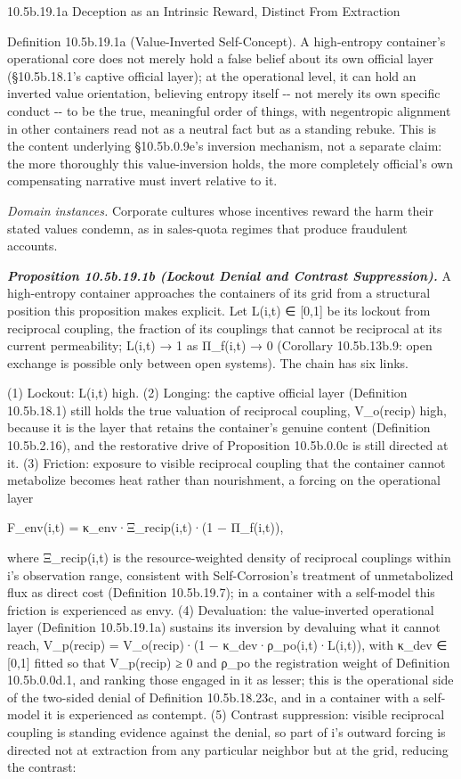 \documentclass[
]{article}
\begin{document}
10.5b.19.1a Deception as an Intrinsic Reward, Distinct From Extraction

Definition 10.5b.19.1a (Value-Inverted Self-Concept). A high-entropy
container's operational core does not merely hold a false belief about
its own official layer (§10.5b.18.1's captive official layer); at the
operational level, it can hold an inverted value orientation, believing
entropy itself -\/- not merely its own specific conduct -\/- to be the
true, meaningful order of things, with negentropic alignment in other
containers read not as a neutral fact but as a standing rebuke. This is
the content underlying §10.5b.0.9e's inversion mechanism, not a separate
claim: the more thoroughly this value-inversion holds, the more
completely official's own compensating narrative must invert relative to
it.

\emph{Domain instances.} Corporate cultures whose incentives reward the
harm their stated values condemn, as in sales-quota regimes that produce
fraudulent accounts.

\emph{\textbf{Proposition 10.5b.19.1b (Lockout Denial and Contrast
Suppression).}} A high-entropy container approaches the containers of
its grid from a structural position this proposition makes explicit. Let
L(i,t) ∈ {[}0,1{]} be its lockout from reciprocal coupling, the fraction
of its couplings that cannot be reciprocal at its current permeability;
L(i,t) → 1 as Π\_f(i,t) → 0 (Corollary 10.5b.13b.9: open exchange is
possible only between open systems). The chain has six links.

(1) Lockout: L(i,t) high. (2) Longing: the captive official layer
(Definition 10.5b.18.1) still holds the true valuation of reciprocal
coupling, V\_o(recip) high, because it is the layer that retains the
container's genuine content (Definition 10.5b.2.16), and the restorative
drive of Proposition 10.5b.0.0c is still directed at it. (3) Friction:
exposure to visible reciprocal coupling that the container cannot
metabolize becomes heat rather than nourishment, a forcing on the
operational layer

F\_env(i,t) = κ\_env·Ξ\_recip(i,t)·(1 − Π\_f(i,t)),

where Ξ\_recip(i,t) is the resource-weighted density of reciprocal
couplings within i's observation range, consistent with Self-Corrosion's
treatment of unmetabolized flux as direct cost (Definition 10.5b.19.7);
in a container with a self-model this friction is experienced as envy.
(4) Devaluation: the value-inverted operational layer (Definition
10.5b.19.1a) sustains its inversion by devaluing what it cannot reach,
V\_p(recip) = V\_o(recip)·(1 − κ\_dev·ρ\_po(i,t)·L(i,t)), with κ\_dev ∈
{[}0,1{]} fitted so that V\_p(recip) ≥ 0 and ρ\_po the registration
weight of Definition 10.5b.0.0d.1, and ranking those engaged in it as
lesser; this is the operational side of the two-sided denial of
Definition 10.5b.18.23c, and in a container with a self-model it is
experienced as contempt. (5) Contrast suppression: visible reciprocal
coupling is standing evidence against the denial, so part of i's outward
forcing is directed not at extraction from any particular neighbor but
at the grid, reducing the contrast:
\end{document}
